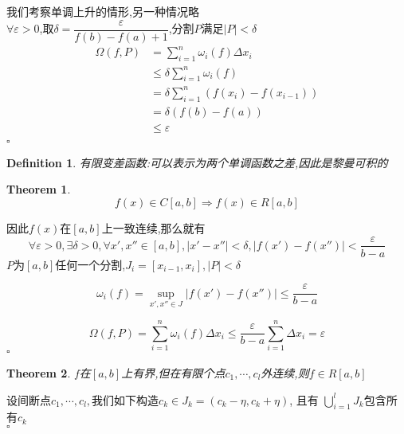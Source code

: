 \documentclass[11pt,hyperref,a4paper,UTF8]{ctexart}
\newtheorem{theorem}{Theorem}[subsection]
\newtheorem{definition}{Definition}[subsection]
\newenvironment{cproof}{%
\heiti{证明}\kaishu
}{%
  \hfill $\square$
  \par\bigskip
}
\newcommand{\abs}[1]{\left|#1\right|}
\begin{document}
\begin{CJK}{UTF8}{gkai}
\begin{cproof}
我们考察单调上升的情形,另一种情况略\\

$\forall \varepsilon > 0 $,取$\delta  = \dfrac{\varepsilon}{f(b) - f(a) + 1}$,分割$P$满足$|P| < \delta$
\[
\begin{aligned}
\Omega(f,P) &= \sum_{i = 1}^{n}\omega_i(f)\Delta x_i\\
&\leq \delta \sum_{i = 1}^{n}\omega_i(f) \\
&=  \delta \sum_{i = 1}^{n}(f(x_i) - f(x_{i - 1}))\\
&=  \delta (f(b) - f(a))\\
&\leq \varepsilon\\
\end{aligned}
\]
\end{cproof}

\begin{definition}
有限变差函数:可以表示为两个单调函数之差,因此是黎曼可积的\\
\end{definition}

\begin{theorem}
  \[f(x) \in C[a,b] \Rightarrow f(x) \in R[a,b]\]
\end{theorem}

\begin{cproof}
  因此$f(x)$在$[a,b]$上一致连续,那么就有
  \[\forall \varepsilon > 0,\exists \delta > 0 ,\forall x',x'' \in [a,b],|x' - x'' | < \delta , \abs{f(x') - f(x'')}  < \dfrac{\varepsilon}{b - a}\]
  $P$为$[a,b]$任何一个分割,$J_i = [x_{i - 1} , x_i],|P| < \delta$

\[\omega_i(f) = \sup_{x',x''\in J}|f(x') - f(x'')|\leq \dfrac{\varepsilon}{b - a}\]
  
  \[\Omega(f,P) = \sum_{i = 1}^{n} \omega_i(f) \Delta x_i
  \leq\dfrac{\varepsilon}{b - a} \sum_{i = 1}^{n} \Delta x_i
  = \varepsilon\]
\end{cproof}

\begin{theorem}
  $f$在$[a,b]$上有界,但在有限个点$c_1,\cdots,c_l$外连续,则$f\in R[a,b]$
\end{theorem}

\begin{cproof}
  设间断点$c_1,\cdots ,c_l ,$我们如下构造$c_k\in J_k = (c_k - \eta , c_k + \eta ) $, 且有 $\bigcup_{i = 1}^l J_k $包含所有$c_k$\\


\end{cproof}
\end{CJK}
\end{document}
